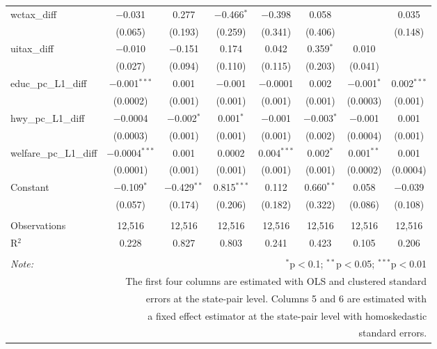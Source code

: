 \begin{table}[!htbp]
\begin{tabular}{@{\extracolsep{5pt}}lccccccc}
  wctax\_diff & $-$0.031 & 0.277 & $-$0.466$^{*}$ & $-$0.398 & 0.058 &  & 0.035 \\ 
  & (0.065) & (0.193) & (0.259) & (0.341) & (0.406) &  & (0.148) \\ 
  uitax\_diff & $-$0.010 & $-$0.151 & 0.174 & 0.042 & 0.359$^{*}$ & 0.010 &  \\ 
  & (0.027) & (0.094) & (0.110) & (0.115) & (0.203) & (0.041) &  \\ 
  educ\_pc\_L1\_diff & $-$0.001$^{***}$ & 0.001 & $-$0.001 & $-$0.0001 & 0.002 & $-$0.001$^{*}$ & 0.002$^{***}$ \\ 
  & (0.0002) & (0.001) & (0.001) & (0.001) & (0.001) & (0.0003) & (0.001) \\ 
  hwy\_pc\_L1\_diff & $-$0.0004 & $-$0.002$^{*}$ & 0.001$^{*}$ & $-$0.001 & $-$0.003$^{*}$ & $-$0.001 & 0.001 \\ 
  & (0.0003) & (0.001) & (0.001) & (0.001) & (0.002) & (0.0004) & (0.001) \\ 
  welfare\_pc\_L1\_diff & $-$0.0004$^{***}$ & 0.001 & 0.0002 & 0.004$^{***}$ & 0.002$^{*}$ & 0.001$^{**}$ & 0.001 \\ 
  & (0.0001) & (0.001) & (0.001) & (0.001) & (0.001) & (0.0002) & (0.0004) \\ 
  Constant & $-$0.109$^{*}$ & $-$0.429$^{**}$ & 0.815$^{***}$ & 0.112 & 0.660$^{**}$ & 0.058 & $-$0.039 \\ 
  & (0.057) & (0.174) & (0.206) & (0.182) & (0.322) & (0.086) & (0.108) \\ 
 \hline \\[-1.8ex] 
Observations & 12,516 & 12,516 & 12,516 & 12,516 & 12,516 & 12,516 & 12,516 \\ 
R$^{2}$ & 0.228 & 0.827 & 0.803 & 0.241 & 0.423 & 0.105 & 0.206 \\ 
\hline 
\hline \\[-1.8ex] 
\textit{Note:}  & \multicolumn{7}{r}{$^{*}$p$<$0.1; $^{**}$p$<$0.05; $^{***}$p$<$0.01} \\ 
 & \multicolumn{7}{r}{The first four columns are estimated with OLS and clustered standard} \\ 
 & \multicolumn{7}{r}{ errors at the state-pair level. Columns 5 and 6 are estimated with} \\ 
 & \multicolumn{7}{r}{a fixed effect estimator at the state-pair level with homoskedastic} \\ 
 & \multicolumn{7}{r}{standard errors.} \\ 
\end{tabular} 
\end{table} 
